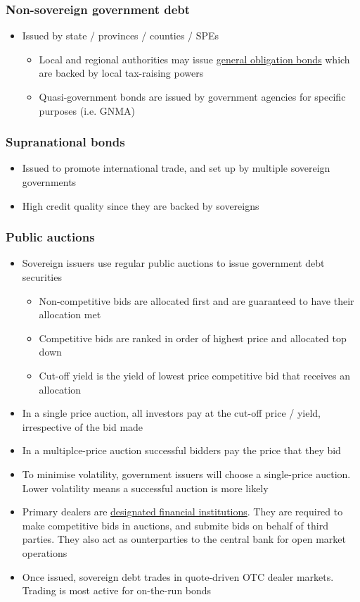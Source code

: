 \documentclass[../notes_compiled.tex]{subfiles}
\begin{document}
\subsubsection{Non-sovereign government debt}
\begin{itemize}
\item Issued by state / provinces / counties / SPEs
\begin{itemize}
\item Local and regional authorities may issue \underline{general obligation bonds} which are backed by local tax-raising powers
\item Quasi-government bonds are issued by government agencies for specific purposes (i.e. GNMA)
\end{itemize}
\end{itemize}

\subsubsection{Supranational bonds}
\begin{itemize}
\item Issued to promote international trade, and set up by multiple sovereign governments
\item High credit quality since they are backed by sovereigns
\end{itemize}

\subsubsection{Public auctions}
\begin{itemize}
\item Sovereign issuers use regular public auctions to issue government debt securities
\begin{itemize}
\item Non-competitive bids are allocated first and are guaranteed to have their allocation met
\item Competitive bids are ranked in order of highest price and allocated top down
\item Cut-off yield is the yield of lowest price competitive bid that receives an allocation
\end{itemize}
\item In a single price auction, all investors pay at the cut-off price / yield, irrespective of the bid made
\item In a multiplce-price auction successful bidders pay the price that they bid
\item To minimise volatility, government issuers will choose a single-price auction. Lower volatility means a successful auction is more likely
\item Primary dealers are \underline{designated financial institutions}. They are required to make competitive bids in auctions, and submite bids on behalf of third parties. They also act as ounterparties to the central bank for open market operations
\item Once issued, sovereign debt trades in quote-driven OTC dealer markets. Trading is most active for on-the-run bonds
\end{itemize}
\end{document}
